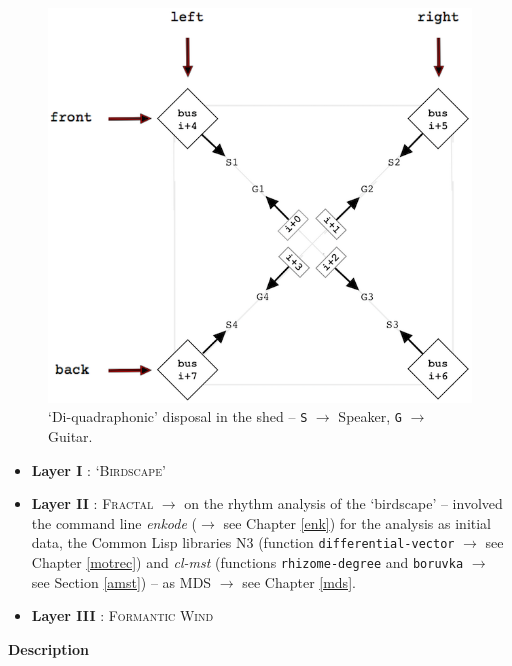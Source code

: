  \begin{figure}[H]
\begin{center}
\includegraphics[scale=3.5]{img/6644}
\caption{`Di-quadraphonic' disposal in the shed -- \texttt{S} $\rightarrow$ Speaker, \texttt{G} $\rightarrow$ Guitar.}
\label{dpan}
\end{center}
\end{figure}

\begin{itemize}[leftmargin=0.4in]
\item \textbf{Layer I} : \textsc{`Birdscape'} 
\item \textbf{Layer II} : \textsc{Fractal} $\rightarrow$ on the rhythm analysis of the `birdscape' -- involved the command line \textsl{enkode} ($\rightarrow$ see Chapter \ref{enk}) for the analysis as initial data, the Common Lisp libraries N3 (function \texttt{differential-vector} $\rightarrow$ see Chapter \ref{motrec}) and \textsl{cl-mst} (functions \texttt{rhizome-degree} and \texttt{boruvka} $\rightarrow$ see Section \ref{amst}) -- as MDS $\rightarrow$ see Chapter \ref{mds}. 
\item \textbf{Layer III} : \textsc{Formantic Wind} 
\end{itemize}

\newpage

\noindent \textbf{{\large Description}}
\hrulefill

\bigskip

